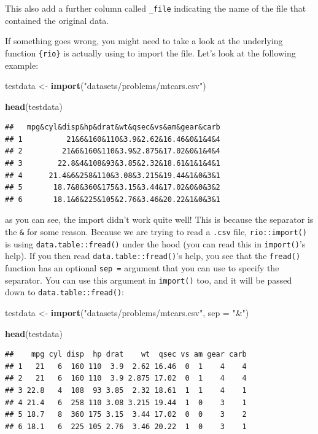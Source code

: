 \documentclass[]{gitbook}
\newenvironment{Shaded}{\begin{snugshade}}{\end{snugshade}}
\newcommand{\DataTypeTok}[1]{\textcolor[rgb]{0.13,0.29,0.53}{#1}}
\newcommand{\KeywordTok}[1]{\textcolor[rgb]{0.13,0.29,0.53}{\textbf{#1}}}
\newcommand{\NormalTok}[1]{#1}
\newcommand{\StringTok}[1]{\textcolor[rgb]{0.31,0.60,0.02}{#1}}
\theoremstyle{definition}
\theoremstyle{definition}
\theoremstyle{definition}
\theoremstyle{remark}
\begin{document}
This also add a further column called \texttt{\_file} indicating the
name of the file that contained the original data.

If something goes wrong, you might need to take a look at the underlying
function \texttt{\{rio\}} is actually using to import the file. Let's
look at the following example:

\begin{Shaded}
\begin{Highlighting}[]
\NormalTok{testdata <-}\StringTok{ }\KeywordTok{import}\NormalTok{(}\StringTok{"datasets/problems/mtcars.csv"}\NormalTok{)}

\KeywordTok{head}\NormalTok{(testdata)}
\end{Highlighting}
\end{Shaded}

\begin{verbatim}
##   mpg&cyl&disp&hp&drat&wt&qsec&vs&am&gear&carb
## 1          21&6&160&110&3.9&2.62&16.46&0&1&4&4
## 2         21&6&160&110&3.9&2.875&17.02&0&1&4&4
## 3        22.8&4&108&93&3.85&2.32&18.61&1&1&4&1
## 4      21.4&6&258&110&3.08&3.215&19.44&1&0&3&1
## 5       18.7&8&360&175&3.15&3.44&17.02&0&0&3&2
## 6       18.1&6&225&105&2.76&3.46&20.22&1&0&3&1
\end{verbatim}

as you can see, the import didn't work quite well! This is because the
separator is the \texttt{\&} for some reason. Because we are trying to
read a \texttt{.csv} file, \texttt{rio::import()} is using
\texttt{data.table::fread()} under the hood (you can read this in
\texttt{import()}'s help). If you then read
\texttt{data.table::fread()}'s help, you see that the \texttt{fread()}
function has an optional \texttt{sep\ =} argument that you can use to
specify the separator. You can use this argument in \texttt{import()}
too, and it will be passed down to \texttt{data.table::fread()}:

\begin{Shaded}
\begin{Highlighting}[]
\NormalTok{testdata <-}\StringTok{ }\KeywordTok{import}\NormalTok{(}\StringTok{"datasets/problems/mtcars.csv"}\NormalTok{, }\DataTypeTok{sep =} \StringTok{"&"}\NormalTok{)}

\KeywordTok{head}\NormalTok{(testdata)}
\end{Highlighting}
\end{Shaded}

\begin{verbatim}
##    mpg cyl disp  hp drat    wt  qsec vs am gear carb
## 1   21   6  160 110  3.9  2.62 16.46  0  1    4    4
## 2   21   6  160 110  3.9 2.875 17.02  0  1    4    4
## 3 22.8   4  108  93 3.85  2.32 18.61  1  1    4    1
## 4 21.4   6  258 110 3.08 3.215 19.44  1  0    3    1
## 5 18.7   8  360 175 3.15  3.44 17.02  0  0    3    2
## 6 18.1   6  225 105 2.76  3.46 20.22  1  0    3    1
\end{verbatim}
\end{document}
